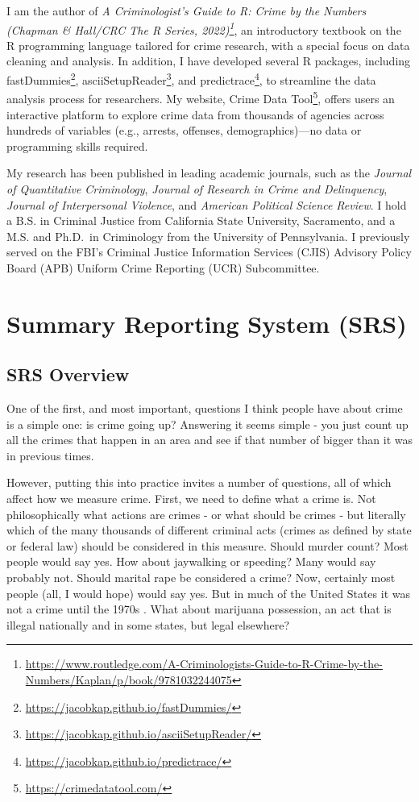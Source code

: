 \documentclass[
]{krantz}
\renewcommand{\href}[2]{#2\footnote{\url{#1}}}
\begin{document}
I am the author of
\emph{\href{https://www.routledge.com/A-Criminologists-Guide-to-R-Crime-by-the-Numbers/Kaplan/p/book/9781032244075}{A
Criminologist's Guide to R: Crime by the Numbers (Chapman \&
Hall/CRC The R Series, 2022)}}, an introductory textbook on
the R programming language tailored for crime research, with
a special focus on data cleaning and analysis. In addition,
I have developed several R packages, including
\href{https://jacobkap.github.io/fastDummies/}{fastDummies},
\href{https://jacobkap.github.io/asciiSetupReader/}{asciiSetupReader},
and
\href{https://jacobkap.github.io/predictrace/}{predictrace},
to streamline the data analysis process for researchers. My
website, \href{https://crimedatatool.com/}{Crime Data Tool},
offers users an interactive platform to explore crime data
from thousands of agencies across hundreds of variables
(e.g., arrests, offenses, demographics)---no data or
programming skills required.

My research has been published in leading academic journals,
such as the \emph{Journal of Quantitative Criminology},
\emph{Journal of Research in Crime and Delinquency},
\emph{Journal of Interpersonal Violence}, and \emph{American
Political Science Review}. I hold a B.S. in Criminal Justice
from California State University, Sacramento, and a M.S. and
Ph.D.~in Criminology from the University of Pennsylvania. I
previously served on the FBI's Criminal Justice Information
Services (CJIS) Advisory Policy Board (APB) Uniform Crime
Reporting (UCR) Subcommittee.

\mainmatter

\part{Summary Reporting System
(SRS)}\label{part-summary-reporting-system-srs}

\chapter{SRS Overview}\label{SRSGeneral}

One of the first, and most important, questions I think
people have about crime is a simple one: is crime going up?
Answering it seems simple - you just count up all the crimes
that happen in an area and see if that number of bigger than
it was in previous times.

However, putting this into practice invites a number of
questions, all of which affect how we measure crime. First,
we need to define what a crime is. Not philosophically what
actions are crimes - or what should be crimes - but
literally which of the many thousands of different criminal
acts (crimes as defined by state or federal law) should be
considered in this measure. Should murder count? Most people
would say yes. How about jaywalking or speeding? Many would
say probably not. Should marital rape be considered a crime?
Now, certainly most people (all, I would hope) would say
yes. But in much of the United States it was not a crime
until the 1970s
\citep{bennice2003marital, mcmahon2009criminalizing}. What
about marijuana possession, an act that is illegal
nationally and in some states, but legal elsewhere?
\end{document}
